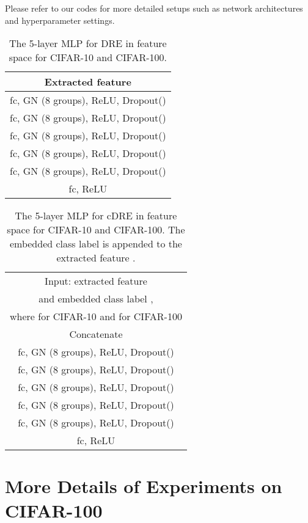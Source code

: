 \documentclass[final,12pt, 3p,times]{elsarticle}
\begin{document}
Please refer to our codes for more detailed setups such as network architectures and hyperparameter settings.

\begin{table}[h]
	\centering
	\caption{The 5-layer MLP for DRE in feature space for CIFAR-10 and CIFAR-100.}
\begin{tabular}{c}
			\toprule
			Extracted feature  \\
			\hline
			fc, GN (8 groups), ReLU, Dropout() \\\hline
			fc, GN (8 groups), ReLU, Dropout() \\\hline
			fc, GN (8 groups), ReLU, Dropout() \\\hline
			fc, GN (8 groups), ReLU, Dropout() \\\hline
			fc, GN (8 groups), ReLU, Dropout() \\\hline
			fc, ReLU \\
			\bottomrule
		\end{tabular}\label{tab:cifar10_MLP5}\end{table}

\begin{table}[h]
	\centering
	\caption{The 5-layer MLP for cDRE in feature space for CIFAR-10 and CIFAR-100. The embedded class label is appended to the extracted feature .}
\begin{tabular}{c}
			\toprule
			Input: extracted feature  \\
			and embedded class label , \\
			where  for CIFAR-10 and  for CIFAR-100 \\
			\hline
			Concatenate \\
			\hline
			fc, GN (8 groups), ReLU, Dropout() \\\hline
			fc, GN (8 groups), ReLU, Dropout() \\\hline
			fc, GN (8 groups), ReLU, Dropout() \\\hline
			fc, GN (8 groups), ReLU, Dropout() \\\hline
			fc, GN (8 groups), ReLU, Dropout() \\\hline
			fc, ReLU \\
			\bottomrule
		\end{tabular}\label{tab:cifar10_cMLP5}\end{table}




\section{More Details of Experiments on CIFAR-100}\label{supp:details_of_cifar100}
\end{document}
